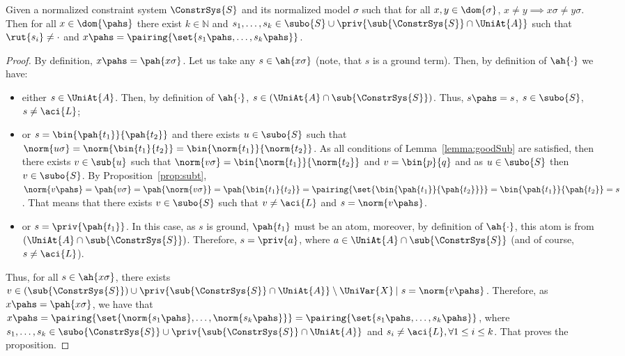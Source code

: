 \begin{prop}\label{prop:mainprop}
 Given a normalized constraint system $\ConstrSys{S}$ 
 and its normalized model $\sigma$ such that for all $x,y\in\dom{\sigma}$, $x\neq y \implies x\sigma\neq y\sigma$. 
 Then  for all $x\in \dom{\pahs}$ there exist $k \in \mathbb{N}$ and $s_1,\dots, s_k \in \subo{S}\cup \priv{\sub{\ConstrSys{S}}\cap\UniAt{A}}$  such that $\rut{s_i} \neq \cdot$ 
and \br $ x\pahs = \pairing{\set{s_1\pahs, \dots, s_k\pahs}}$.

\begin{proof}
\raggedright
 By definition, $x\pahs = \pah{x\sigma}$. Let us take any $s\in \ah{x\sigma}$ (note, that $s$ is a ground term). Then, by definition of $\ah{\cdot}$ we have:
\begin{itemize}
 \item either $s \in \UniAt{A}$. Then, by definition of $\ah{\cdot}$, $s\in (\UniAt{A} \cap \sub{\ConstrSys{S}})$. Thus, $s\pahs = s$, $s \in  \subo{S}$, $s\neq \aci{L}$;
 
 \item or $s = \bin{\pah{t_1}}{\pah{t_2}}$ and there exists $u \in \subo{S}$ such that $\norm{u\sigma}=\norm{\bin{t_1}{t_2}}=\bin{\norm{t_1}}{\norm{t_2}}$. 
  As all conditions of Lemma~\ref{lemma:goodSub} are satisfied, then there exists $v\in\sub{u}$ such that $\norm{v\sigma}=\bin{\norm{t_1}}{\norm{t_2}}$ and 
$v=\bin{p}{q}$ 
  and as $u\in\subo{S}$ then $v\in\subo{S}$.
  By Proposition~\ref{prop:subt}, $\norm{v\pahs}=\pah{v\sigma}=\pah{\norm{v\sigma}}=\pah{\bin{t_1}{t_2}}=\pairing{\set{\bin{\pah{t_1}}{\pah{t_2}}}} = \bin{\pah{t_1}}{\pah{t_2}} = s$. 
  That means that there exists  $v \in \subo{S}$ such that $v\neq \aci{L}$ and $s=\norm{v\pahs}$.
 


 \item or $s=\priv{\pah{t_1}}$. In this case, as $s$ is ground, $\pah{t_1}$ must be an atom, moreover, by definition of $\ah{\cdot}$, this atom is from $(\UniAt{A} \cap \sub{\ConstrSys{S}})$. 
	Therefore, $s=\priv{a}$, where $a\in \UniAt{A} \cap \sub{\ConstrSys{S}}$ (and of course, $s\neq  \aci{L}$).
\end{itemize}

Thus,  for all $s\in \ah{x\sigma}$, there exists $v \in   (\sub{\ConstrSys{S}})\cup \priv{\sub{\ConstrSys{S}}\cap\UniAt{A}} \setminus \UniVar{X}\,|\ s=\norm{v\pahs}$. 
Therefore, as  $x\pahs=\pah{x\sigma}$, we have that $x\pahs = \pairing{\set{\norm{s_1\pahs},\dots, \norm{s_k\pahs}}} =  \pairing{\set{s_1\pahs,\dots, s_k\pahs}}$, where   $s_1,\dots, s_k \in \subo{\ConstrSys{S}} \cup \priv{\sub{\ConstrSys{S}}\cap\UniAt{A}}$ and $s_i\neq \aci{L}, \forall 1\leq i \leq k$.  That proves the proposition.
\end{proof}

\end{prop}



